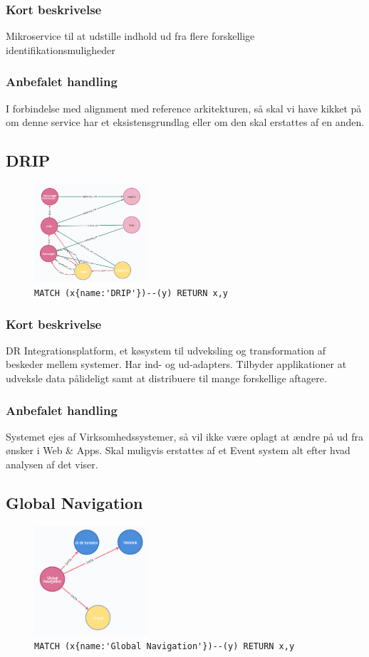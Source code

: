 \documentclass{article}
\begin{document}
\subsubsection*{Kort beskrivelse}
Mikroservice til at udstille indhold ud fra flere forskellige identifikationsmuligheder
\subsubsection*{Anbefalet handling}
I forbindelse med alignment med reference arkitekturen, så skal vi have kikket på om denne service har et eksistensgrundlag eller om den skal erstattes af en anden.


\subsection{DRIP}
\begin{figure}[H]
\includegraphics[width=120pt]{DRIP.PNG}
\cprotect\caption{\verb|MATCH (x{name:'DRIP'})--(y) RETURN x,y|}
\end{figure}
\subsubsection*{Kort beskrivelse}
DR Integrationsplatform, et køsystem til udveksling og transformation af beskeder mellem systemer. Har ind- og ud-adapters.
Tilbyder applikationer at udveksle data pålideligt samt at distribuere til mange forskellige aftagere.
\subsubsection*{Anbefalet handling}
Systemet ejes af Virksomhedssystemer, så vil ikke være oplagt at ændre på ud fra ønsker i Web \& Apps. 
Skal muligvis erstattes af et Event system alt efter hvad analysen af det viser.


\subsection{Global Navigation}
\begin{figure}[H]
\includegraphics[width=120pt]{GlobalNavigation.PNG}
\cprotect\caption{\verb|MATCH (x{name:'Global Navigation'})--(y) RETURN x,y|}
\end{figure}
\end{document}
